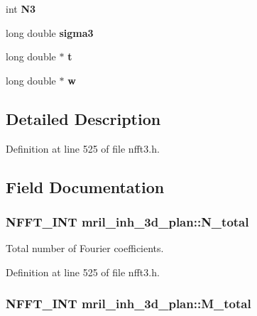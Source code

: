 \begin{DoxyCompactItemize}
\item 
\hypertarget{structmril__inh__3d__plan_ae596bbf35deb08eff8bfbbe0bbc13989}{int {\bfseries N3}}\label{structmril__inh__3d__plan_ae596bbf35deb08eff8bfbbe0bbc13989}

\item 
\hypertarget{structmril__inh__3d__plan_a26e17b2e0c29cf24a162afe4762964a5}{long double {\bfseries sigma3}}\label{structmril__inh__3d__plan_a26e17b2e0c29cf24a162afe4762964a5}

\item 
\hypertarget{structmril__inh__3d__plan_a18aa5418abc97a758f5c07b8dabcff77}{long double $\ast$ {\bfseries t}}\label{structmril__inh__3d__plan_a18aa5418abc97a758f5c07b8dabcff77}

\item 
\hypertarget{structmril__inh__3d__plan_a9688d8a0cdd89e17a71c45efd8ab3d46}{long double $\ast$ {\bfseries w}}\label{structmril__inh__3d__plan_a9688d8a0cdd89e17a71c45efd8ab3d46}

\end{DoxyCompactItemize}


\subsection{Detailed Description}


Definition at line 525 of file nfft3.\-h.



\subsection{Field Documentation}
\hypertarget{structmril__inh__3d__plan_a4dc3583cf7f316db903b3ae7c68beb46}{
\subsubsection[{N\-\_\-total}]{\setlength{\rightskip}{0pt plus 5cm}N\-F\-F\-T\-\_\-\-I\-N\-T mril\-\_\-inh\-\_\-3d\-\_\-plan\-::\-N\-\_\-total}}\label{structmril__inh__3d__plan_a4dc3583cf7f316db903b3ae7c68beb46}


Total number of Fourier coefficients. 



Definition at line 525 of file nfft3.\-h.

\hypertarget{structmril__inh__3d__plan_a0b00c9217e0f3c700963e3bd54ea6f9e}{
\subsubsection[{M\-\_\-total}]{\setlength{\rightskip}{0pt plus 5cm}N\-F\-F\-T\-\_\-\-I\-N\-T mril\-\_\-inh\-\_\-3d\-\_\-plan\-::\-M\-\_\-total}}\label{structmril__inh__3d__plan_a0b00c9217e0f3c700963e3bd54ea6f9e}


